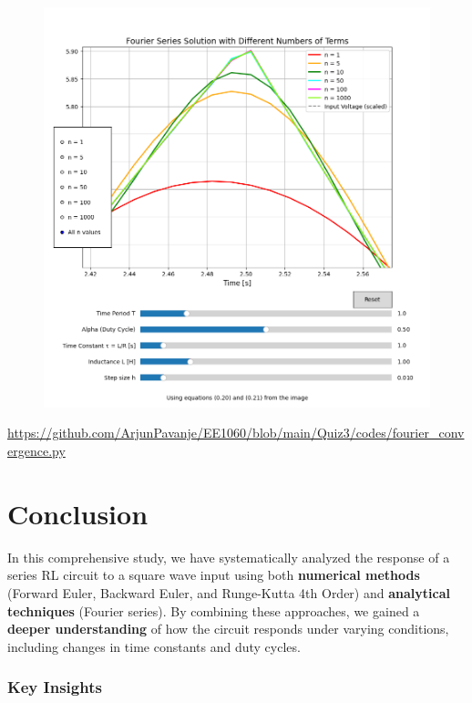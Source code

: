 \documentclass[12pt,a4paper]{report}
\begin{document}
\begin{figure}
    \centering
    \includegraphics[width=1\linewidth]{figs/conv-3.png}
    \label{fig:enter-label}
\end{figure}
\url{https://github.com/ArjunPavanje/EE1060/blob/main/Quiz3/codes/fourier_convergence.py}
\chapter{Conclusion}

In this comprehensive study, we have systematically analyzed the response of a series RL circuit to a square wave input using both \textbf{numerical methods} (Forward Euler, Backward Euler, and Runge-Kutta 4th Order) and \textbf{analytical techniques} (Fourier series). By combining these approaches, we gained a \textbf{deeper understanding} of how the circuit responds under varying conditions, including changes in time constants and duty cycles.

\subsection{Key Insights}
\end{document}
